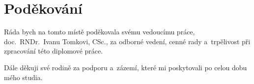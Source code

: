\chapter*{Poděkování}

Ráda bych na tomto místě poděkovala svému vedoucímu práce, doc.~RNDr.~Ivanu Tomkovi, CSc., za odborné vedení, cenné rady a~trpělivost při zpracování této diplomové práce.

Dále děkuji své rodině za podporu a~zázemí, které mi poskytovali po celou dobu mého studia.

\newpage
